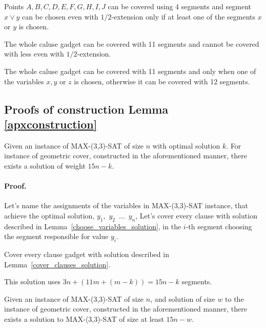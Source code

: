 \begin{lemma}
Points $A, B, C, D, E, F, G, H, I, J$ can be covered using
4 segments and segment $x \lor y$ can be chosen
even with $1/2$-extension
only if at least one of the segments $x$ or $y$ is chosen.
\end{lemma}

\begin{lemma}
\label{cover_clauses_segments_no_less}
The whole caluse gadget can be covered with 11 segments and
cannot be covered with less
even with $1/2$-extension.
\end{lemma}

\begin{lemma}
\label{cover_clauses_solution}
The whole caluse gadget can be covered with 11 segments and
only when one of the variables $x, y$ or $z$ is chosen,
otherwise it can be covered with 12 segments.
\end{lemma}

\subsection{Proofs of construction Lemma \ref{apxconstruction}}
\begin{lemma}
	\label{construction_correctness}
	Given an instance of MAX-(3,3)-SAT of size $n$
	with optimal solution $k$.
	For instance of geometric cover, constructed
	in the aforementioned manner, 
	there exists a solution of weight $15n - k$.
\end{lemma}
\paragraph{Proof.}
Let's name the assignments of the variables in MAX-(3,3)-SAT instance,
that achieve the optimal solution,
$y_1$,~$y_2$~$\ldots$~$y_n$,
Let's cover every clause with solution described in
Lemma~\ref{choose_variables_solution},
in the $i$-th segment choosing the segment responsible for value $y_i$.

Cover every clause gadget with solution described in
Lemma~\ref{cover_clauses_solution}.

This solution uses $3n + (11m + (m-k)) = 15n - k$ segments.

\begin{lemma}
	\label{construction_completness}
	Given an instance of MAX-(3,3)-SAT of size $n$,
	and solution of size $w$ to the instance of geometric cover,
	constructed in the aforementioned manner, 
	there exists a solution to MAX-(3,3)-SAT of size at least $15n - w$.
\end{lemma}
